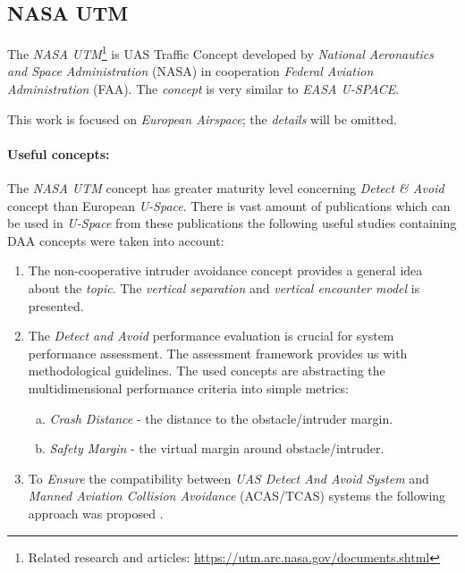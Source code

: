 \subsection{NASA UTM}\label{sec:NASAUtm}

\noindent The \emph{NASA UTM}\footnote{Related research and articles: \url{https://utm.arc.nasa.gov/documents.shtml}} is UAS Traffic Concept developed by \emph{National Aeronautics and Space Administration} (NASA) in cooperation \emph{Federal Aviation Administration} (FAA). The \emph{concept} is very similar to \emph{EASA U-SPACE}.

\begin{note}
    This work is focused on \emph{European Airspace}; the \emph{details} will be omitted. 
\end{note}

\paragraph{Useful concepts:} The \emph{NASA UTM} concept has greater maturity level concerning \emph{Detect \& Avoid} concept than European \emph{U-Space}. There is vast amount of publications which can be used in \emph{U-Space} from these publications the following useful studies containing DAA concepts were taken into account:

\begin{enumerate}    
    \item The non-cooperative intruder avoidance concept \cite{cone2017uas} provides a general idea about the \emph{topic}. The \emph{vertical separation} and \emph{vertical encounter model} is presented.
    
    \item The \emph{Detect and Avoid} performance evaluation is crucial for system performance assessment. The assessment framework \cite{lee2016wide} provides us with methodological guidelines. The used concepts are abstracting the multidimensional performance criteria into simple metrics:
    
    \begin{enumerate}[a.]
        \item \emph{Crash Distance} - the distance to the obstacle/intruder margin.
        
        \item \emph{Safety Margin} - the virtual margin around obstacle/intruder.
    \end{enumerate}
    
    \item To \emph{Ensure} the compatibility between \emph{UAS Detect And Avoid System} and \emph{Manned Aviation Collision Avoidance} (ACAS/TCAS) systems the following approach was proposed \cite{thipphavong2017ensuring}.
\end{enumerate}
